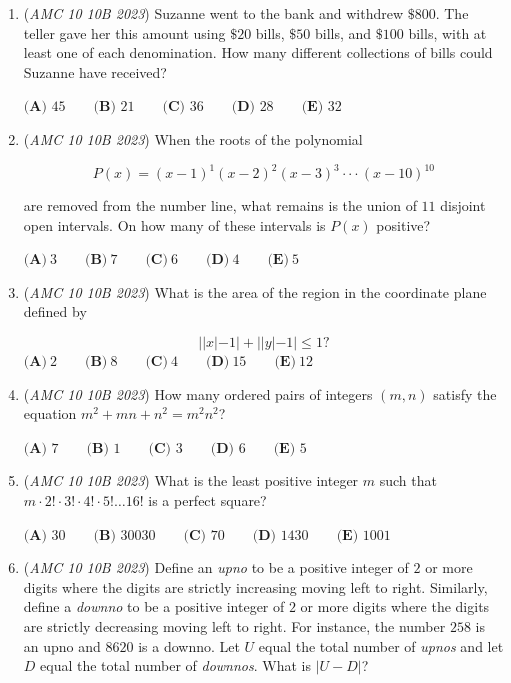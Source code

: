 \begin{enumerate}
 $\textbf{(A)}\ 3 \qquad \textbf{(B)}\ 5 \qquad \textbf{(C)}\ 4 \qquad \textbf{(D)}\ 8 \qquad \textbf{(E)}\ 6$


	\item (\textit{AMC 10 10B 2023}) Suzanne went to the bank and withdrew $\$800$. The teller gave her this amount using $\$20$ bills, $\$50$ bills, and $\$100$ bills, with at least one of each denomination. How many different collections of bills could Suzanne have received?


 $\textbf{(A) }45\qquad\textbf{(B) }21\qquad\textbf{(C) }36\qquad\textbf{(D) }28\qquad\textbf{(E) }32$


	\item (\textit{AMC 10 10B 2023}) When the roots of the polynomial 


 
 \[P(x)  = (x-1)^1 (x-2)^2 (x-3)^3 \cdot \cdot \cdot (x-10)^{10}\]


 are removed from the number line, what remains is the union of $11$ disjoint open intervals. On how many of these intervals is $P(x)$ positive?


 $\textbf{(A)}~3\qquad\textbf{(B)}~7\qquad\textbf{(C)}~6\qquad\textbf{(D)}~4\qquad\textbf{(E)}~5$


	\item (\textit{AMC 10 10B 2023}) What is the area of the region in the coordinate plane defined by


 
 \[| | x | - 1 | + | | y | - 1 | \le 1?\]
$\textbf{(A)}\ 2 \qquad \textbf{(B)}\ 8 \qquad \textbf{(C)}\ 4 \qquad \textbf{(D)}\ 15 \qquad \textbf{(E)}\ 12$


	\item (\textit{AMC 10 10B 2023}) How many ordered pairs of integers $(m,n)$ satisfy the equation $m^2+mn+n^2 = m^2n^2$?


 $\textbf{(A) }7\qquad\textbf{(B) }1\qquad\textbf{(C) }3\qquad\textbf{(D) }6\qquad\textbf{(E) }5$


	\item (\textit{AMC 10 10B 2023}) What is the least positive integer $m$ such that $m \cdot 2! \cdot 3!\cdot 4!\cdot 5! \dots 16!$ is a perfect square?


 $\textbf{(A) }30\qquad\textbf{(B) }30030\qquad\textbf{(C) }70\qquad\textbf{(D) }1430\qquad\textbf{(E) }1001$


	\item (\textit{AMC 10 10B 2023}) Define an \textit{upno} to be a positive integer of $2$ or more digits where the digits are strictly
increasing moving left to right. Similarly, define a \textit{downno} to be a positive integer 
of $2$ or more digits where the digits are strictly decreasing moving left to right. For
instance, the number $258$ is an upno and $8620$ is a downno. Let $U$ equal the total
number of \textit{upnos} and let $D$ equal the total number of \textit{downnos}. What is $|U-D|$?



\end{enumerate}
